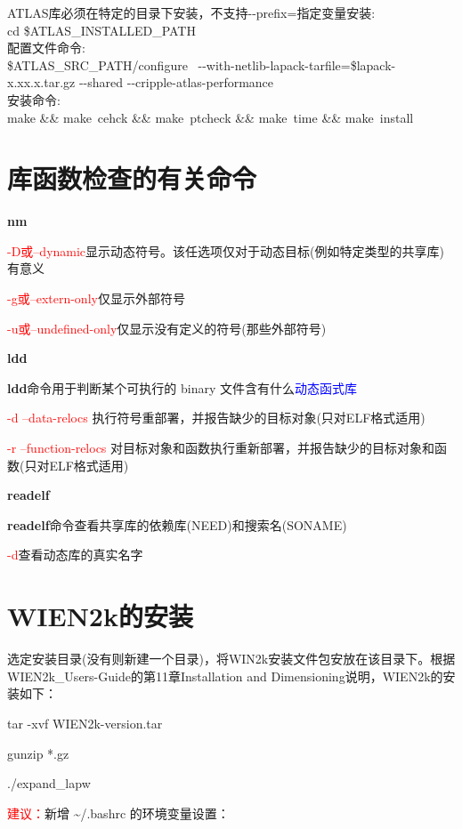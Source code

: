 \documentclass[10pt,a4paper]{article}
\newcommand{\upcite}[1]{\hspace{0ex}\textsuperscript{\cite{#1}}} %
\begin{document}
\textrm{ATLAS}库必须在特定的目录下安装，不支持\textrm{-\/-prefix=}指定变量安装:\\

\textrm{cd \$ATLAS\_INSTALLED\_PATH}\\ 
配置文件命令:\\
\textrm{\$ATLAS\_SRC\_PATH/configure ~-\/-with-netlib-lapack-tarfile=\$lapack-x.xx.x.tar.gz -\/-shared -\/-cripple-atlas-performance}\\
安装命令:\\
\textrm{make \&\& make~cehck \&\& make~ptcheck \&\& make~time \&\& make~install}

\section{库函数检查的有关命令}
\textbf{nm}

\textcolor{red}{-D或--dynamic}\;\;显示动态符号。该任选项仅对于动态目标(例如特定类型的共享库)有意义

\textcolor{red}{-g或--extern-only}\;\;仅显示外部符号

\textcolor{red}{-u或--undefined-only}\;\;仅显示没有定义的符号(那些外部符号)

\textbf{ldd}

\textbf{ldd}命令用于判断某个可执行的 binary 文件含有什么\textcolor{blue}{动态函式库}

\textcolor{red}{-d --data-relocs}\;\; 执行符号重部署，并报告缺少的目标对象(只对ELF格式适用)

\textcolor{red}{-r --function-relocs}\;\; 对目标对象和函数执行重新部署，并报告缺少的目标对象和函数(只对ELF格式适用)

\textbf{readelf}

\textbf{readelf}命令查看共享库的依赖库(\textrm{NEED})和搜索名(\textrm{SONAME})

\textcolor{red}{-d}\;\;查看动态库的真实名字

\section{WIEN2k的安装}
选定安装目录(没有则新建一个目录)，将\textrm{WIN2k}安装文件包安放在该目录下。根据\textrm{WIEN2k\_Users-Guide}\upcite{WIEN2K-UG_2001}的第\textrm{11}章\textrm{Installation and Dimensioning}说明，\textrm{WIEN2k}的安装如下：

tar -xvf WIEN2k-version.tar

gunzip *.gz

./expand\_lapw

\textcolor{red}{建议：}新增 \~\//.bashrc 的环境变量设置：
\end{document}
